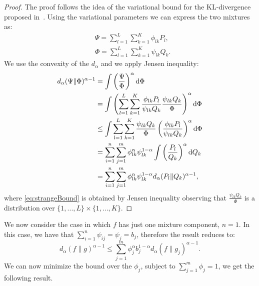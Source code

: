 \documentclass{article}
\begin{document}
\begin{proof}
The proof follows the idea of the variational bound for the KL-divergence proposed in~\cite{hershey2007approximating}. Using the variational parameters we can express the two mixtures as:
\begin{align*}
    & \Psi = \sum_{l=1}^L \sum_{k=1}^K \phi_{lk} P_l,\\
    & \Phi = \sum_{l=1}^L \sum_{k=1}^K \psi_{lk} Q_k.
\end{align*}
    We use the convexity of the $d_{\alpha}$ and we apply Jensen inequality:
    \begin{align}
        d_{\alpha}(\Psi \| \Phi)^{\alpha-1} & = \int \left( \frac{\Psi}{\Phi} \right)^{\alpha} \mathrm{d}\Phi \notag\\
        & = \int \left( \sum_{l=1}^L \sum_{k=1}^K \frac{\phi_{lk} P_l}{\psi_{lk} Q_k} \frac{\psi_{lk} Q_k}{\Phi} \right)^{\alpha} \mathrm{d}\Phi \notag \\
        & \le \int \sum_{l=1}^L \sum_{k=1}^K \frac{\psi_{lk} Q_k}{\Phi} \left(  \frac{\phi_{lk} P_l}{\psi_{lk} Q_k}  \right)^{\alpha} \mathrm{d}\Phi \label{eq:strangeBound}\\
        & = \sum_{i=1}^n \sum_{j=1}^m \phi_{lk}^{\alpha} \psi_{lk}^{1-\alpha}  \int \left( \frac{P_l}{Q_k}  \right)^{\alpha} \mathrm{d}Q_k \notag \\
        & = \sum_{i=1}^n \sum_{j=1}^m \phi_{lk}^{\alpha} \psi_{lk}^{1-\alpha}  d_{\alpha}(P_l \| Q_k)^{\alpha-1}, \notag
    \end{align}
    where \eqref{eq:strangeBound} is obtained by Jensen inequality observing that $\frac{\psi_{lk} Q_k}{\Phi}$ is a distribution over $\{1,...,L\} \times \{1,...,K\}$.
\end{proof}

We now consider the case in which $f$ has just one mixture component, \ie $n = 1$. In this case, we have that $\sum_{i=1}^n \psi_{ij}= \psi_j = b_j$, therefore the result reduces to:
\begin{equation}
     d_{\alpha} (f \| g)^{\alpha-1} \le  \sum_{j=1}^m \phi_{j}^\alpha b_{j}^{1-\alpha} d_{\alpha} (f \| g_j)^{\alpha-1}.
\end{equation}
We can now minimize the bound over the $\phi_j$, subject to $\sum_{j=1}^m \phi_j = 1$, we get the following result.
\end{document}
